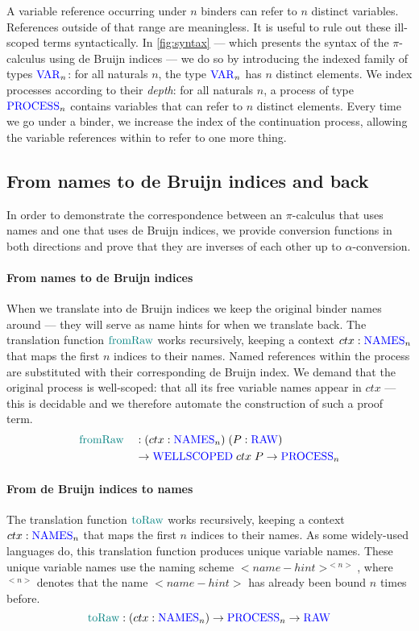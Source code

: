 \documentclass[sigplan,10pt,anonymous,review]{acmart}
\theoremstyle{definition}
\newcommand{\picalc}{$\pi$-calculus}
\newcommand{\type}[1]{\textcolor{blue}{\operatorname{#1}}}
\newcommand{\func}[1]{\textcolor{teal}{\operatorname{#1}}}
\newcommand{\Var}{\type{VAR}}
\newcommand{\Process}{\type{PROCESS}}
\newcommand{\Raw}{\type{RAW}}
\newcommand{\Names}{\type{NAMES}}
\newcommand{\WellScoped}{\type{WELLSCOPED}}
\begin{document}
A variable reference occurring under $n$ binders can refer to $n$ distinct variables.
References outside of that range are meaningless.
It is useful to rule out these ill-scoped terms syntactically.
In \autoref{fig:syntax} --- which presents the syntax of the \picalc{} using de Bruijn indices --- we do so by introducing the indexed family of types \cite{Dybjer1994} $\Var_n$: for all naturals $n$, the type $\Var_n$ has $n$ distinct elements.
We index processes according to their \emph{depth}: for all naturals $n$, a process of type $\Process_n$ contains variables that can refer to $n$ distinct elements.
Every time we go under a binder, we increase the index of the continuation process, allowing the variable references within to refer to one more thing.


\subsection{From names to de Bruijn indices and back}
\label{from_to_deBruijn}
In order to demonstrate the correspondence between an \picalc{} that uses names and one that uses de Bruijn indices, we provide conversion functions in both directions and prove that they are inverses of each other up to $\alpha$-conversion.

\paragraph{From names to de Bruijn indices}
When we translate into de Bruijn indices we keep the original binder names around --- they will serve as name hints for when we translate back.
The translation function $\func{fromRaw}$ works recursively, keeping a context $ctx : \Names_n$ that maps the first $n$ indices to their names.
Named references within the process are substituted with their corresponding de Bruijn index.
We demand that the original process is well-scoped: that all its free variable names appear in $ctx$ --- this is decidable and we therefore automate the construction of such a proof term.
\begin{alignat*}{2}
    &\func{fromRaw} && : (ctx : \Names_n) \; (P : \Raw) \\
    &               && \to \WellScoped \; ctx \; P \to \Process_n
\end{alignat*}

\paragraph{From de Bruijn indices to names}
The translation function $\func{toRaw}$ works recursively, keeping a context $ctx : \Names_n$ that maps the first $n$ indices to their names.
As some widely-used languages do, this translation function produces unique variable names.
These unique variable names use the naming scheme $<name-hint>^{<n>}$, where $^{<n>}$ denotes that the name $<name-hint>$ has already been bound $n$ times before.
\begin{equation*}
    \func{toRaw} : (ctx : \Names_n) \to \Process_n \to \Raw
\end{equation*}
\end{document}
